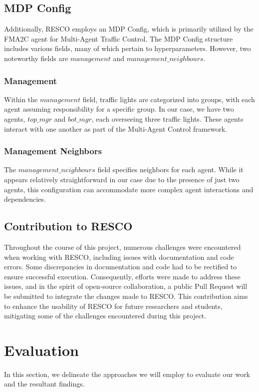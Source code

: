 \subsection{MDP Config}
Additionally, RESCO employs an MDP Config, which is primarily utilized by the FMA2C agent for Multi-Agent Traffic Control. The MDP Config structure includes various fields, many of which pertain to hyperparameters. However, two noteworthy fields are $management$ and $management\_neighbours$.

\subsubsection{Management}
Within the $management$ field, traffic lights are categorized into groups, with each agent assuming responsibility for a specific group. In our case, we have two agents, $top\_mgr$ and $bot\_mgr$, each overseeing three traffic lights. These agents interact with one another as part of the Multi-Agent Control framework.

\subsubsection{Management Neighbors}
The $management\_neighbours$ field specifies neighbors for each agent. While it appears relatively straightforward in our case due to the presence of just two agents, this configuration can accommodate more complex agent interactions and dependencies.

\subsection{Contribution to RESCO}
Throughout the course of this project, numerous challenges were encountered when working with RESCO, including issues with documentation and code errors. Some discrepancies in documentation and code had to be rectified to ensure successful execution. Consequently, efforts were made to address these issues, and in the spirit of open-source collaboration, a public Pull Request will be submitted to integrate the changes made to RESCO. This contribution aims to enhance the usability of RESCO for future researchers and students, mitigating some of the challenges encountered during this project.

\section{Evaluation}
In this section, we delineate the approaches we will employ to evaluate our work and the resultant findings.

